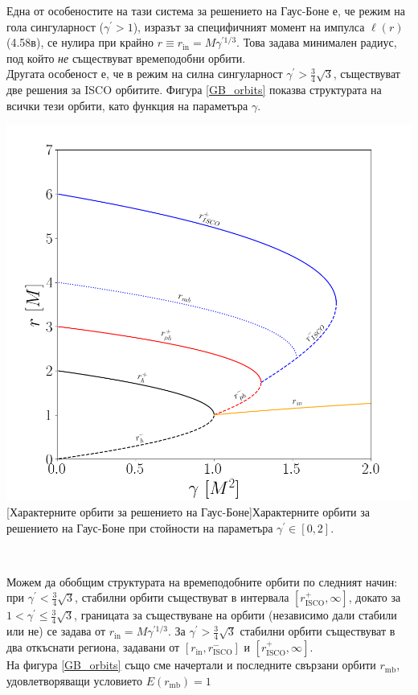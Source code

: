 Една от особеностите на тази система за решението на Гаус-Боне е, че режим на гола сингуларност ($\gamma^\prime > 1$), изразът за специфичният момент на импулса $\ell(r)$ (4.58в), се нулира при крайно $r \equiv r_\text{in} = M\gamma^{\prime1/3}$. Това задава минимален радиус, под който \emph{не} съществуват времеподобни орбити.\\

Другата особеност е, че в режим на силна сингуларност $\gamma^\prime > \frac{3}{4}\sqrt{3}$, съществуват две решения за ISCO орбитите. Фигура \ref{GB_orbits} показва структурата на всички тези орбити, като функция на параметъра $\gamma$.\\

\begin{minipage}{18em}
	\hspace{-0.3cm}
	\includegraphics[scale = 0.3]{GB_Orbits.png}
	[Характерните орбити за решението на Гаус-Боне]{\small Характерните орбити за решението на Гаус-Боне при стойности на параметъра $\gamma^\prime \in [0, 2]$.}
	\label{GB_orbits}
\end{minipage}\,\,\,
\begin{minipage}{18em}
Можем да обобщим структурата на времеподобните орбити по следният начин: при $\gamma^\prime < \frac{3}{4}\sqrt{3}$, стабилни орбити съществуват в интервала $[r_\text{ISCO}^+, \infty]$, докато за $1 < \gamma^\prime \le \frac{3}{4}\sqrt{3}$, границата за съществуване на орбити (независимо дали стабили или не) се задава от $r_\text{in} = M\gamma^{\prime 1/3}$. За $\gamma^\prime > \frac{3}{4}\sqrt{3}$ стабилни орбити съществуват в два откъснати региона, задавани от $[r_\text{in}, r^-_\text{ISCO}]$ и $[r_\text{ISCO}^+,\infty]$.\\

На фигура \ref{GB_orbits} също сме начертали и последните свързани орбити $r_\text{mb}$, удовлетворяващи условието $E(r_\text{mb}) = 1$

\end{minipage}

